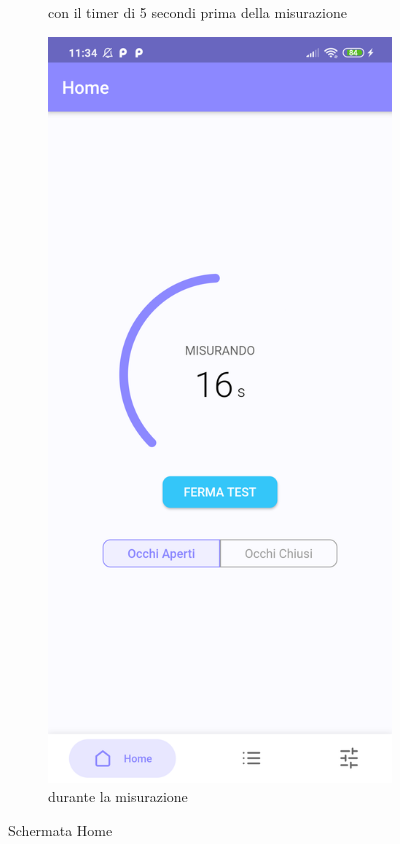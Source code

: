 \begin{figure}[!htb]
\begin{subfigure}{.35\textwidth}
        \caption{con il timer di 5 secondi prima della misurazione}
        \label{fig:home_premeasure}
    \end{subfigure}
    \begin{subfigure}{.35\textwidth}
        \includegraphics[width=\textwidth]{figures/screenshot/redmi_note_8t/home_measuring.png}
        \caption{durante la misurazione}
        \label{fig:home_measure}
    \end{subfigure}
    \caption{Schermata Home}
\end{figure}

